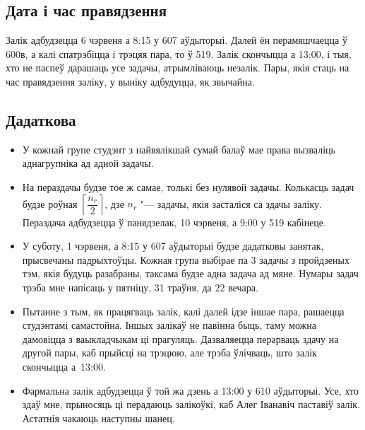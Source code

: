 \documentclass[12pt, a4paper]{extarticle}
\begin{document}
    \subsection{Дата і час правядзення}
    Залік адбудзецца 6 чэрвеня а 8:15 у 607 аўдыторыі. Далей ён перамяшчаецца ў 600в, а калі спатрэбіцца і трэцяя пара, то ў 519. Залік скончыцца а 13:00, і тыя, хто не паспеў дарашаць усе задачы, атрымліваюць незалік. Пары, якія стаць на час правядзення заліку, у выніку адбудуцца, як звычайна.

    \subsection{Дадаткова}
    \begin{itemize}
        \item У кожнай групе студэнт з найвялікшай сумай балаў мае права вызваліць аднагрупніка ад адной задачы.
        \item На пераздачы будзе тое ж самае, толькі без нулявой задачы. Колькасць задач будзе роўная $\left\lceil \dfrac{n_{r}}{2} \right\rceil$, дзе $n_r$ "--- задачы, якія засталіся са здачы заліку. Пераздача адбудзецца ў панядзелак, 10 чэрвеня, а 9:00 у 519 кабінеце.
        \item У суботу, 1 чэрвеня, а 8:15 у 607 аўдыторыі будзе дадатковы занятак, прысвечаны падрыхтоўцы. Кожная група выбірае па 3 задачы з пройдзеных тэм, якія будуць разабраны, таксама будзе адна задача ад мяне. Нумары задач трэба мне напісаць у пятніцу, 31 траўня, да 22 вечара.
        \item Пытанне з тым, як працягваць залік, калі далей ідзе іншае пара, рашаецца студэнтамі самастойна. Іншых залікаў не павінна быць, таму можна дамовіцца з ваыкладчыкам ці прагуляць. Дазваляецца перарваць здачу на другой пары, каб прыйсці на трэцюю, але трэба ўлічваць, што залік скончыцца а~13:00.
        \item Фармальна залік адбудзецца ў той жа дзень а 13:00 у 610 аўдыторыі. Усе, хто здаў мне, прыносяць ці перадаюць залікоўкі, каб Алег Іванавіч паставіў залік. Астатнія чакаюць наступны шанец.
    \end{itemize}
\end{document}
